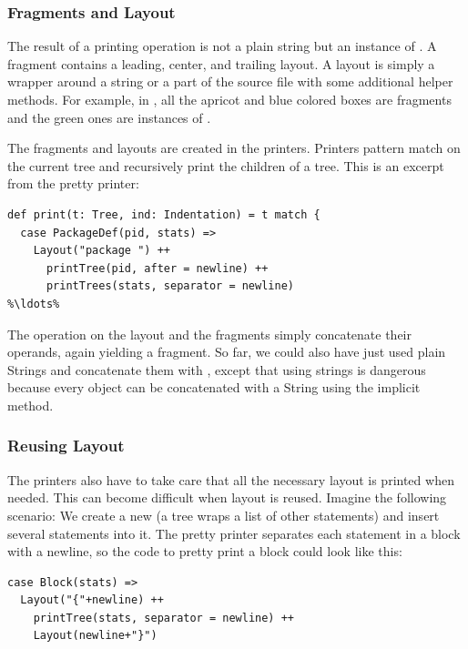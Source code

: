 \subsubsection{Fragments and Layout}

The result of a printing operation is not a plain string but an instance of . A fragment contains a leading, center, and trailing layout. A layout is simply a wrapper around a string or a part of the source file with some additional helper methods. For example, in , all the apricot and blue colored boxes are fragments and the green ones are instances of .

The fragments and layouts are created in the printers. Printers pattern match on the current tree and recursively print the children of a tree. This is an excerpt from the pretty printer:

\begin{lstlisting}
def print(t: Tree, ind: Indentation) = t match {
  case PackageDef(pid, stats) =>
    Layout("package ") ++ 
      printTree(pid, after = newline) ++ 
      printTrees(stats, separator = newline)
%\ldots%
\end{lstlisting}

The \src{++} operation on the layout and the fragments simply concatenate their operands, again yielding a fragment. So far, we could also have just used plain Strings and concatenate them with \src{+}, except that using strings is dangerous because every object can be concatenated with a String using the implicit  method.

\subsubsection{Reusing Layout}

The printers also have to take care that all the necessary layout is printed when needed. This can become difficult when layout is reused. Imagine the following scenario: We create a new  (a  tree wraps a list of other statements) and insert several statements into it. The pretty printer separates each statement in a block with a newline, so the code to pretty print a block could look like this:

\begin{lstlisting}
case Block(stats) =>
  Layout("{"+newline) ++ 
    printTree(stats, separator = newline) ++ 
    Layout(newline+"}")
\end{lstlisting}


